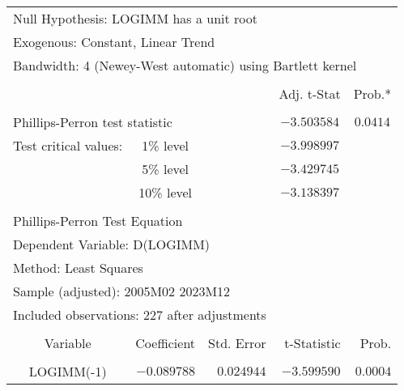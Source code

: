 \begin{tabular}{lrrrr}
\multicolumn{3}{l}{Null Hypothesis: LOGIMM has a unit root}&\multicolumn{1}{c}{}&\multicolumn{1}{c}{}\\
\multicolumn{3}{l}{Exogenous: Constant, Linear Trend}&\multicolumn{1}{c}{}&\multicolumn{1}{c}{}\\
\multicolumn{5}{l}{Bandwidth: 4 (Newey-West automatic) using Bartlett kernel}\\
[4.5pt] \hline \\ [-4.5pt]
\multicolumn{1}{c}{}&\multicolumn{1}{c}{}&\multicolumn{1}{c}{}&\multicolumn{1}{c}{Adj. t-Stat}&\multicolumn{1}{c}{Prob.*}\\
[4.5pt] \hline \\ [-4.5pt]
\multicolumn{2}{l}{Phillips-Perron test statistic}&\multicolumn{1}{l}{}&\multicolumn{1}{c}{$-3.503584$}&\multicolumn{1}{c}{$0.0414$}\\
\multicolumn{1}{l}{Test critical values:}&\multicolumn{1}{c}{1\% level}&\multicolumn{1}{c}{}&\multicolumn{1}{c}{$-3.998997$}&\multicolumn{1}{c}{}\\
\multicolumn{1}{c}{}&\multicolumn{1}{c}{5\% level}&\multicolumn{1}{c}{}&\multicolumn{1}{c}{$-3.429745$}&\multicolumn{1}{c}{}\\
\multicolumn{1}{c}{}&\multicolumn{1}{c}{10\% level}&\multicolumn{1}{c}{}&\multicolumn{1}{c}{$-3.138397$}&\multicolumn{1}{c}{}\\
[4.5pt] \hline \\ [-4.5pt]
\multicolumn{2}{l}{Phillips-Perron Test Equation}&\multicolumn{1}{c}{}&\multicolumn{1}{c}{}&\multicolumn{1}{c}{}\\
\multicolumn{3}{l}{Dependent Variable: D(LOGIMM)}&\multicolumn{1}{c}{}&\multicolumn{1}{c}{}\\
\multicolumn{2}{l}{Method: Least Squares}&\multicolumn{1}{c}{}&\multicolumn{1}{c}{}&\multicolumn{1}{c}{}\\
\multicolumn{3}{l}{Sample (adjusted): 2005M02 2023M12}&\multicolumn{1}{c}{}&\multicolumn{1}{c}{}\\
\multicolumn{4}{l}{Included observations: 227 after adjustments}&\multicolumn{1}{c}{}\\
[4.5pt] \hline \\ [-4.5pt]
\multicolumn{1}{c}{Variable}&\multicolumn{1}{r}{Coefficient}&\multicolumn{1}{r}{Std. Error}&\multicolumn{1}{r}{t-Statistic}&\multicolumn{1}{r}{Prob.}\\
[4.5pt] \hline \\ [-4.5pt]
\multicolumn{1}{c}{LOGIMM(-1)}&\multicolumn{1}{r}{$-0.089788$}&\multicolumn{1}{r}{$0.024944$}&\multicolumn{1}{r}{$-3.599590$}&\multicolumn{1}{r}{$0.0004$}\\

\end{tabular}
